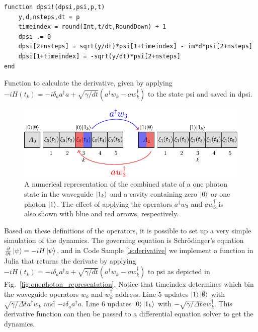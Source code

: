  
\begin{listing}[H]
\begin{verbatim}
function dpsi!(dpsi,psi,p,t)
    y,d,nsteps,dt = p
    timeindex = round(Int,t/dt,RoundDown) + 1
    dpsi .= 0
    dpsi[2+nsteps] = sqrt(y/dt)*psi[1+timeindex] - im*d*psi[2+nsteps]
    dpsi[1+timeindex] = -sqrt(y/dt)*psi[2+nsteps]
end
\end{verbatim}
\caption{Function to calculate the derivative, given by applying $- i H(t_k) = - i \delta_a a^\dagger a + \sqrt{\gamma/dt}(a^\dagger w_k - a w_k^\dagger)$ to the state {\selectfont psi} and saved in {\selectfont dpsi}.}
\label{ls:derivative}
\end{listing}
\begin{figure}
    \centering
    \includegraphics[width=0.8 \linewidth]{figures/cavity_destroy_create.pdf}
    \caption{A numerical representation of the combined state of a one photon state in the waveguide $\ket{1_k}$ and a cavity containing zero $\ket{0}$ or one photon $\ket{1}$. The effect of applying the operators $a^\dagger w_3$ and $a w_3^\dagger$ is also shown with blue and red arrows, respectively. }
    \label{fig:cavity_create}
\end{figure}

Based on these definitions of the operators, it is possible to set up a very simple simulation of the dynamics. The governing equation is Schr{\"o}dinger's equation $\frac{\partial}{\partial t} \ket{\psi} = - i H \ket{\psi}$, and in Code Sample \ref{ls:derivative} we implement a function in Julia that returns the derivate  by applying $- i H(t_k) = - i \delta_a a^\dagger a + \sqrt{\gamma/dt}(a^\dagger w_k - a w_k^\dagger)$ to {\selectfont psi} as depicted in Fig.~\ref{fig:onephoton_representation}. Notice that {\selectfont timeindex} determines which bin the waveguide operators $w_k$ and $w_k^\dagger$ address. Line 5 updates $\ket{1}\ket{\emptyset}$ with $\sqrt{\gamma/\Delta t} a^\dagger w_k$ and $- i \delta_a a^\dagger a$. Line 6 updates $\ket{0}\ket{1_k}$ with $-\sqrt{\gamma/\Delta t} a w_k^\dagger$. This derivative function can then be passed to a differential equation solver to get the dynamics.

